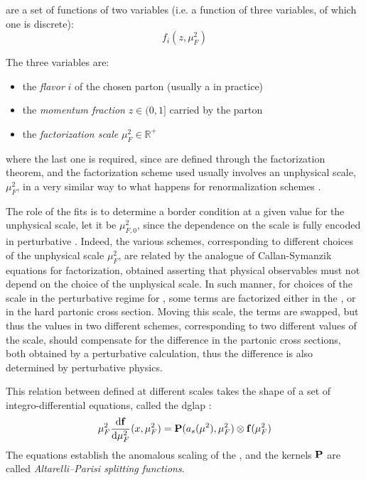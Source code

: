
\pdfs are a set of functions of two variables (i.e. a function of three
variables, of which one is discrete):
\begin{equation}
  f_i(z, \mu_F^2)
  \label{eq:qcd/pdfs}
\end{equation}

The three variables are:
\begin{itemize}
  \item the \textit{flavor} $i$ of the chosen parton (usually a \pid in practice)
  \item the \textit{momentum fraction} $z \in (0,1]$ carried by the parton
  \item the \textit{factorization scale} $\mu_F^2 \in \mathbb{R}^+$
\end{itemize}
where the last one is required, since \pdfs are defined through the
factorization theorem, and the factorization scheme used usually involves an
unphysical scale, $\mu_F^2$, in a very similar way to what happens for
renormalization schemes \cite{Ellis:1996mzs}.

The role of the \pdf fits is to determine a border condition at a given value
for the unphysical scale, let it be $\mu_{F,0}^2$, since the dependence on the
scale is fully encoded in perturbative \qcd.
%
Indeed, the various schemes, corresponding to different choices of the
unphysical scale $\mu_F^2$, are related by the analogue of Callan-Symanzik
equations for factorization, obtained asserting that physical observables must
not depend on the choice of the unphysical scale.
%
In such manner, for choices of the scale in the perturbative regime for \qcd,
some terms are factorized either in the \pdf, or in the hard partonic cross
section.
Moving this scale, the terms are swapped, but thus the \pdf values in two
different schemes, corresponding to two different values of the scale, should
compensate for the difference in the partonic cross sections, both obtained by
a perturbative calculation, thus the difference is also determined by
perturbative physics.

This relation between \pdfs defined at different scales takes the shape of a
set of integro-differential equations, called the \acrfull{dglap}
\cite{Altarelli:1977zs,Gribov:1972ri,Dokshitzer:1977sg}:
\begin{equation}
	\muF^2 \dv{\vb f}{\muF^2}{}(x,\muF^2) = \vb P (a_s(\mu^2),\muF^2) \otimes \vb f(\muF^2)
	\label{eq:qcd/dglap}
\end{equation}
The equations establish the anomalous scaling of the \pdfs, and the kernels
${\vb P}$ are called \textit{Altarelli--Parisi splitting functions}.

